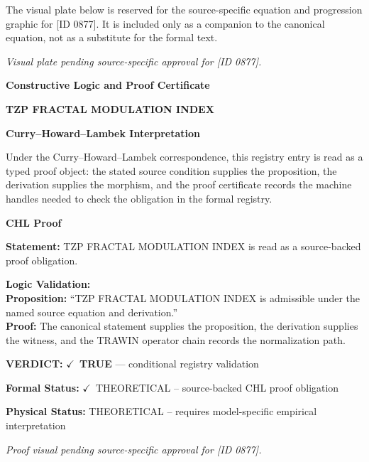 \begingroup\footnotesize\sloppy
The visual plate below is reserved for the source-specific equation and progression graphic for [ID 0877]. It is included only as a companion to the canonical equation, not as a substitute for the formal text.
\par\endgroup
\begingroup\footnotesize\itshape
Visual plate pending source-specific approval for [ID 0877].
\par\endgroup

\clearpage
\begingroup\tzpsupportsetup
\noindent\textbf{\fontsize{10.8pt}{12.8pt}\selectfont [ID 0877] Constructive Logic and Proof Certificate}\par
\noindent\textbf{\fontsize{10pt}{12pt}\selectfont TZP FRACTAL MODULATION INDEX}\par
\vspace{0.45em}
\begingroup
\footnotesize
\setlength{\parskip}{0.22em}
\setlength{\parindent}{0pt}
\noindent\textbf{Curry--Howard--Lambek Interpretation}\par
Under the Curry--Howard--Lambek correspondence, this registry entry is read as a typed proof
object: the stated source condition supplies the proposition, the derivation supplies the
morphism, and the proof certificate records the machine handles needed to check the obligation
in the formal registry.

\vspace{0.45em}
\noindent\textbf{CHL Proof}\par
\textbf{Statement:} TZP FRACTAL MODULATION INDEX is read as a source-backed proof obligation.

\textbf{Logic Validation:}\\
\textbf{Proposition:} ``TZP FRACTAL MODULATION INDEX is admissible under the named source equation and derivation.''\\
\textbf{Proof:} The canonical statement supplies the proposition, the derivation supplies the witness, and the TRAWIN operator chain records the normalization path.

\textbf{VERDICT:} \ensuremath{\checkmark}\ \textbf{TRUE} --- conditional registry validation

\textbf{Formal Status:} \ensuremath{\checkmark}\ THEORETICAL -- source-backed CHL proof obligation

\textbf{Physical Status:} THEORETICAL -- requires model-specific empirical interpretation
\par\vspace{0.45em}
\par
\vfill
\begingroup\footnotesize\itshape
Proof visual pending source-specific approval for [ID 0877].
\par\endgroup
\vfill
\endgroup
\endgroup
